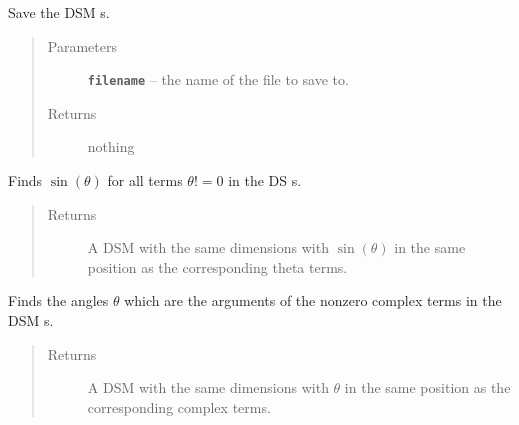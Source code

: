 \documentclass[letterpaper,10pt,english]{sphinxmanual}
\begin{document}
\begin{fulllineitems}

\begin{fulllineitems}
\label{index:DictionarySparseMatrix.DS.save_dict}
Save the DSM s.
\begin{quote}\begin{description}
\item[{Parameters}] \leavevmode
\textbf{\texttt{filename}} -- the name of the file to save to.

\item[{Returns}] \leavevmode
nothing

\end{description}\end{quote}

\end{fulllineitems}


\begin{fulllineitems}
\label{index:DictionarySparseMatrix.DS.sin}
Finds \(\sin(\theta)\) for all terms     \(\theta != 0\) in the DS s.
\begin{quote}\begin{description}
\item[{Returns}] \leavevmode
A DSM with the same dimensions with     \(\sin(\theta)\) in the      same position as the corresponding theta terms.

\end{description}\end{quote}

\end{fulllineitems}


\begin{fulllineitems}
\label{index:DictionarySparseMatrix.DS.sparse_angles}
Finds the angles \(\theta\) which are the arguments     of the nonzero complex terms in the DSM s.
\begin{quote}\begin{description}
\item[{Returns}] \leavevmode
A DSM with the same dimensions with     \(\theta\) in the same      position as the corresponding complex terms.


\end{description}
\end{quote}
\end{fulllineitems}
\end{fulllineitems}
\end{document}
